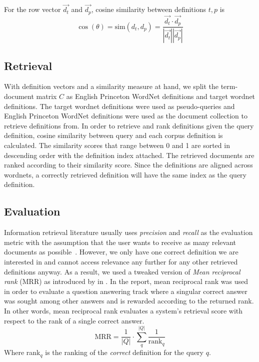 For the row vector $\vec{d_t}$ and $\vec{d_p}$, cosine similarity between definitions $t, p$ is
\begin{equation}
    \cos(\theta) = \text{sim}(d_t, d_p) = \frac{\vec{d_t} \cdot \vec{d_p}}{|\vec{d_t}||\vec{d_p}|}
\end{equation}

\subsection{Retrieval}%
\label{sub:retrieval}

With definition vectors and a similarity measure at hand, we split the term-document matrix $C$ as English Princeton WordNet definitions and target wordnet definitions.
The target wordnet definitions were used as pseudo-queries and English Princeton WordNet definitions were used as the document collection to retrieve definitions from.
In order to retrieve and rank definitions given the query definition, cosine similarity between query and each corpus definition is calculated.
The similarity scores that range between 0 and 1 are sorted in descending order with the definition index attached.
The retrieved documents are ranked according to their similarity score.
Since the definitions are aligned across wordnets, a correctly retrieved definition will have the same index as the query definition.

\subsection{Evaluation}%
\label{sub:evaluation}

Information retrieval literature usually uses \emph{precision} and \emph{recall} as the evaluation metric with the assumption that the user wants to receive as many relevant documents as possible~\cite{salton_state_1992}.
However, we only have one correct definition we are interested in and cannot access relevance any further for any other retrieved definitions anyway.
As a result, we used a tweaked version of \emph{Mean reciprocal rank} (MRR) as introduced by \textcite{voorhees_trec-8_1999} in .
In the report, mean reciprocal rank was used in order to evaluate a question answering track where a singular correct answer was sought among other answers and is rewarded according to the returned rank.
In other words, mean reciprocal rank evaluates a system's retrieval score with respect to the rank of a single correct answer. %
\begin{equation}
    \text{MRR} = \frac{1}{|Q|} \cdot \sum_{q}^{|Q|} \frac{1}{\text{rank}_{q}}
\end{equation}
Where rank$_q$ is the ranking of the \emph{correct} definition for the query $q$.

